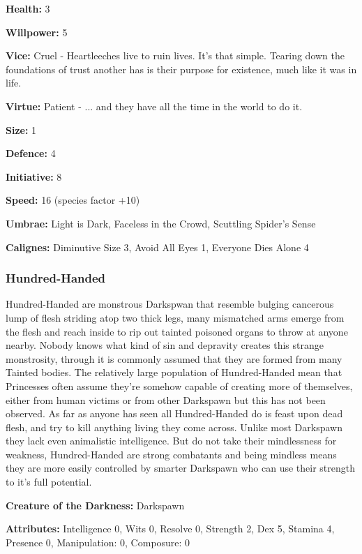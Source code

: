 \noindent \textbf{Health:} 3

\noindent \textbf{Willpower:} 5

\noindent \textbf{Vice:} Cruel - Heartleeches live to ruin lives. It's that simple. Tearing down the foundations of trust another has is their purpose for existence, much like it was in life.

\noindent \textbf{Virtue:} Patient - ... and they have all the time in the world to do it.

\noindent \textbf{Size:} 1

\noindent \textbf{Defence:} 4

\noindent \textbf{Initiative:} 8

\noindent \textbf{Speed:} 16 (species factor +10)

\noindent \textbf{Umbrae:} Light is Dark, Faceless in the Crowd, Scuttling Spider's Sense

\noindent \textbf{Calignes:} Diminutive Size 3, Avoid All Eyes 1, Everyone Dies Alone 4

\subsubsection*{Hundred-Handed}

Hundred-Handed are monstrous Darkspwan that resemble bulging cancerous lump of flesh striding atop two thick legs, many mismatched arms emerge from the flesh and reach inside to rip out tainted poisoned organs to throw at anyone nearby. Nobody knows what kind of sin and depravity creates this strange monstrosity, through it is commonly assumed that they are formed from many Tainted bodies. The relatively large population of Hundred-Handed mean that Princesses often assume they're somehow capable of creating more of themselves, either from human victims or from other Darkspawn but this has not been observed. As far as anyone has seen all Hundred-Handed do is feast upon dead flesh, and try to kill anything living they come across. Unlike most Darkspawn they lack even animalistic intelligence. But do not take their mindlessness for weakness, Hundred-Handed are strong combatants and being mindless means they are more easily controlled by smarter Darkspawn who can use their strength to it's full potential. 

\noindent \textbf{Creature of the Darkness:} Darkspawn

\noindent \textbf{Attributes:} Intelligence 0, Wits 0, Resolve 0, Strength 2, Dex 5, Stamina 4, Presence 0, Manipulation: 0, Composure: 0

